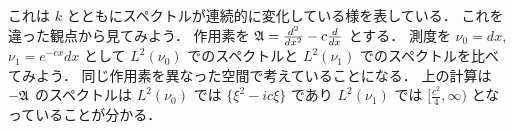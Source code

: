 \begin{center}
\end{center}




\begin{comment}
\begin{center}
\begin{pspicture}(-1,-4)(5,3) %
\psset{arrowsize=3pt 2, arrowlength=1.5}
\psset{xunit=8mm, yunit=12mm}
\psaxes[labels=none,showorigin=true,linewidth=.2pt,ticks=none]{->}(0,0)(-1,-2)(4.5,2)
\psset{linewidth=1pt,arrows=c-c,linecolor=red}
\psline(.5,0)(4.2,0)


\uput[90](.5,0){$\ds \frac{c^2}{4}$}
\uput{5pt}[45](1,-3){$-\gen$}
\end{pspicture} 
%
\begin{pspicture}(-1,-4)(5,3) %
\psset{arrowsize=3pt 2, arrowlength=1.5}
\psset{xunit=8mm, yunit=12mm}
\psaxes[labels=y,showorigin=true,linewidth=.2pt,ticks=none]{->}(0,0)(-1,-2)(4.5,2)
\psset{linewidth=1pt,arrows=c-c,linecolor=red}
\pscurve(5,2)(1,0)(5,-2)
\uput{5pt}[90](1,0){$\frac{c(c-2k)}{4}$}
\uput{5pt}[45](1,-3){$-\gen - k\frac{d}{dx}$}
\end{pspicture} 
\end{center}
\end{comment}


これは $k$ とともにスペクトルが連続的に変化している様を表している．
これを違った観点から見てみよう．
作用素を ${\mathfrak A} = \frac{d^2}{dx^2} - c\frac{d}{dx}$ とする．
測度を $\nu_0=dx$, $\nu_1=e^{-cx}dx$ として $L^2(\nu_0)$ でのスペクトルと
$L^2(\nu_1)$ でのスペクトルを比べてみよう．
同じ作用素を異なった空間で考えていることになる．
上の計算は $-{\mathfrak A}$ のスペクトルは $L^2(\nu_0)$ では $\{\xi^2 - ic\xi\}$
であり $L^2(\nu_1)$ では $[\frac{c^2}{4},\infty)$ となっていることが分かる．


\begin{center}
\end{center}


